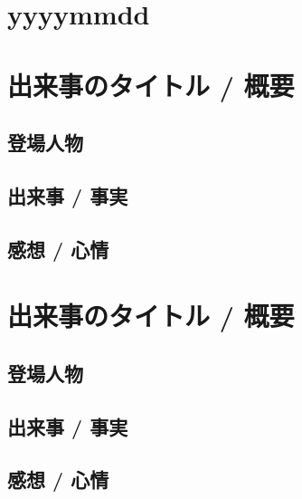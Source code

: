 \section*{yyyymmdd}

\setcounter{section}{0}

\section{出来事のタイトル / 概要}

\subsection{登場人物}

\subsection{出来事 / 事実}

\subsection{感想 / 心情}


\section{出来事のタイトル / 概要}

\subsection{登場人物}

\subsection{出来事 / 事実}

\subsection{感想 / 心情}

